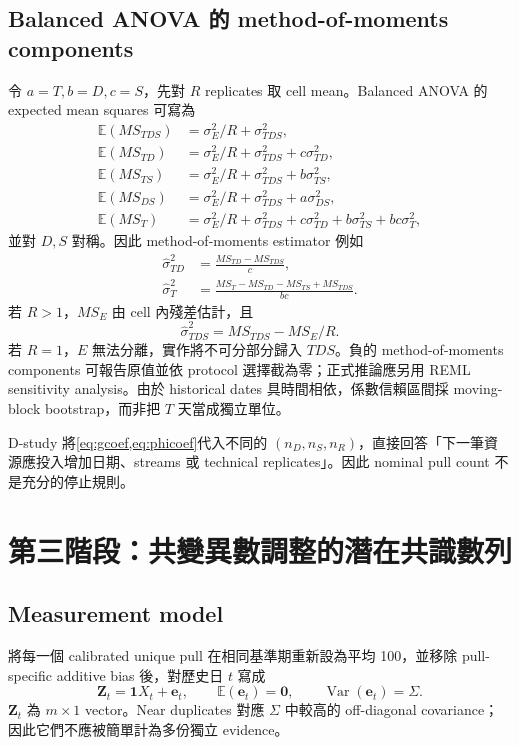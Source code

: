 \documentclass[12pt,a4paper,oneside]{article}
\newcommand{\E}{\mathbb{E}}
\newcommand{\Var}{\operatorname{Var}}
\newcommand{\one}{\bm{1}}
\begin{document}
\subsection{Balanced ANOVA 的 method-of-moments components}

令 $a=T,b=D,c=S$，先對 $R$ replicates 取 cell mean。Balanced ANOVA 的 expected mean squares 可寫為
\begin{align}
\E(MS_{TDS})&=\sigma_E^2/R+\sigma_{TDS}^2,\\
\E(MS_{TD})&=\sigma_E^2/R+\sigma_{TDS}^2+c\sigma_{TD}^2,\\
\E(MS_{TS})&=\sigma_E^2/R+\sigma_{TDS}^2+b\sigma_{TS}^2,\\
\E(MS_{DS})&=\sigma_E^2/R+\sigma_{TDS}^2+a\sigma_{DS}^2,\\
\E(MS_T)&=\sigma_E^2/R+\sigma_{TDS}^2+c\sigma_{TD}^2+b\sigma_{TS}^2+bc\sigma_T^2,
\end{align}
並對 $D,S$ 對稱。因此 method-of-moments estimator 例如
\begin{align}
\widehat\sigma_{TD}^2&=\frac{MS_{TD}-MS_{TDS}}{c},\\
\widehat\sigma_T^2&=\frac{MS_T-MS_{TD}-MS_{TS}+MS_{TDS}}{bc}.
\end{align}
若 $R>1$，$MS_E$ 由 cell 內殘差估計，且
\begin{equation}
\widehat\sigma_{TDS}^2=MS_{TDS}-MS_E/R.
\end{equation}
若 $R=1$，$E$ 無法分離，實作將不可分部分歸入 $TDS$。負的 method-of-moments components 可報告原值並依 protocol 選擇截為零；正式推論應另用 REML sensitivity analysis。由於 historical dates 具時間相依，係數信賴區間採 moving-block bootstrap，而非把 $T$ 天當成獨立單位。

D-study 將\cref{eq:gcoef,eq:phicoef}代入不同的 $(n_D,n_S,n_R)$，直接回答「下一筆資源應投入增加日期、streams 或 technical replicates」。因此 nominal pull count 不是充分的停止規則。

\section{第三階段：共變異數調整的潛在共識數列}

\subsection{Measurement model}

將每一個 calibrated unique pull 在相同基準期重新設為平均 100，並移除 pull-specific additive bias 後，對歷史日 $t$ 寫成
\begin{equation}
\bm Z_t=\one X_t+\bm e_t,
\qquad \E(\bm e_t)=\bm 0,
\qquad \Var(\bm e_t)=\Sigma.
\label{eq:consensusmodel}
\end{equation}
$\bm Z_t$ 為 $m\times1$ vector。Near duplicates 對應 $\Sigma$ 中較高的 off-diagonal covariance；因此它們不應被簡單計為多份獨立 evidence。
\end{document}
